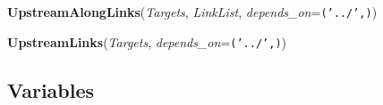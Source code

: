     \label{System:LinkManagement:UpstreamAlongLinks}

    \vspace{0.5ex}

\hspace{.8\funcindent}\begin{boxedminipage}{\funcwidth}

    \raggedright \textbf{UpstreamAlongLinks}(\textit{Targets}, \textit{LinkList}, \textit{depends\_on}={\tt ('../',)})

\setlength{\parskip}{2ex}
\setlength{\parskip}{1ex}
    \end{boxedminipage}

    \label{System:LinkManagement:UpstreamLinks}

    \vspace{0.5ex}

\hspace{.8\funcindent}\begin{boxedminipage}{\funcwidth}

    \raggedright \textbf{UpstreamLinks}(\textit{Targets}, \textit{depends\_on}={\tt ('../',)})

\setlength{\parskip}{2ex}
\setlength{\parskip}{1ex}
    \end{boxedminipage}



  \subsection{Variables}

